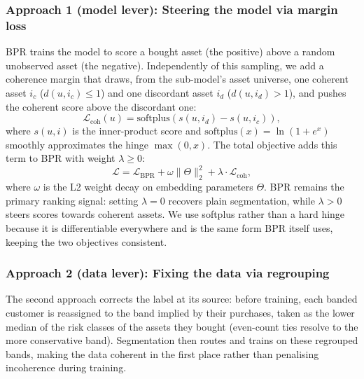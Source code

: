 \subsubsection{Approach 1 (model lever): Steering the model via margin loss}
BPR trains the model to score a bought asset (the positive) above a random unobserved asset (the negative). Independently of this sampling, we add a coherence margin that draws, from the sub-model's asset universe, one coherent asset $i_c$ ($d(u, i_c) \leq 1$) and one discordant asset $i_d$ ($d(u, i_d) > 1$), and pushes the coherent score above the discordant one:
\begin{equation}
\mathcal{L}_{\text{coh}}(u) = \text{softplus}\!\left(s(u, i_d) - s(u, i_c)\right),
\end{equation}
where $s(u, i)$ is the inner-product score and $\text{softplus}(x) = \ln(1 + e^x)$ smoothly approximates the hinge $\max(0, x)$. The total objective adds this term to BPR with weight $\lambda \geq 0$:
\begin{equation}
\mathcal{L} = \mathcal{L}_{\text{BPR}} + \omega \|\Theta\|_2^2 + \lambda \cdot \mathcal{L}_{\text{coh}},
\end{equation}
where $\omega$ is the L2 weight decay on embedding parameters $\Theta$. BPR remains the primary ranking signal: setting $\lambda = 0$ recovers plain segmentation, while $\lambda > 0$ steers scores towards coherent assets. We use softplus rather than a hard hinge because it is differentiable everywhere and is the same form BPR itself uses, keeping the two objectives consistent.

\subsubsection{Approach 2 (data lever): Fixing the data via regrouping}
The second approach corrects the label at its source: before training, each banded customer is reassigned to the band implied by their purchases, taken as the lower median of the risk classes of the assets they bought (even-count ties resolve to the more conservative band). Segmentation then routes and trains on these regrouped bands, making the data coherent in the first place rather than penalising incoherence during training.